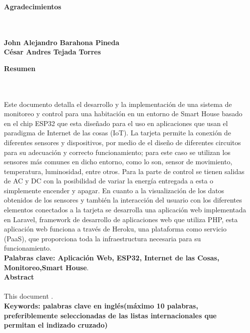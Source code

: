 \newpage{\pagestyle{empty}\cleardoublepage}

\newpage
\thispagestyle{empty} \textbf{}\normalsize
\\\\\\%
\textbf{\LARGE Agradecimientos}
\\\\

\textbf{John Alejandro Barahona Pineda}\\

\textbf{César Andres Tejada Torres}\\

\newpage{\pagestyle{empty}\cleardoublepage}

\newpage
\textbf{\LARGE Resumen}
\\\\
Este documento detalla el desarrollo y la implementación de una sistema de monitoreo y control para una habitación en un entorno de Smart House basado en el chip ESP32 que esta diseñado para el uso en aplicaciones que usan el paradigma de Internet de las cosas (IoT). La tarjeta permite la conexión de diferentes sensores y dispositivos, por medio de el diseño de diferentes circuitos para su adecuación y correcto funcionamiento; para este caso se utilizan los sensores más comunes en dicho entorno, como lo son, sensor de movimiento, temperatura, luminosidad, entre otros. Para la parte de control se tienen salidas de AC y DC con la posibilidad de variar la energía entregada a esta o simplemente encender y apagar. En cuanto a la visualización de los datos obtenidos de los sensores y también la interacción del usuario con los diferentes elementos conectados a la tarjeta se desarrolla una aplicación web implementada en Laravel, framework de desarrollo de aplicaciones web que utiliza PHP, esta aplicación web funciona a través de Heroku, una plataforma como servicio (PaaS), que proporciona toda la infraestructura necesaria para su funcionamiento.\\
\textbf{\small Palabras clave: Aplicación Web, ESP32, Internet de las Cosas, Monitoreo,Smart House}.\\[2.0cm]
\textbf{\LARGE Abstract}\\\\
This document .\\[2.0cm]
\textbf{\small Keywords: palabras clave en ingl\'{e}s(m\'{a}ximo 10 palabras, preferiblemente seleccionadas de las listas internacionales que permitan el indizado cruzado)}\\